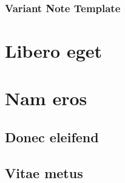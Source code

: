 \lipsum[4]


 \lipsum[110-111]

\begin{phNote2}
\subsubsection*{Variant Note Template}
\noindent\lipsum[106]
\end{phNote2}

\lipsum[113-115]

\section*{Libero eget} \lipsum[116-118]
\section*{Nam eros} \lipsum[119-120]

\subsection*{Donec eleifend} \lipsum[120-121]
\subsection*{Vitae metus} \lipsum[124-125]

